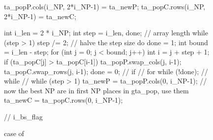 \documentclass[nojss,shortnames,article]{jss}
\begin{document}
\begin{sidewaysfigure}
\begin{minipage}{0.56\linewidth}
\begin{CodeChunk}
\begin{CodeInput}
{	    ta_popP.cols(i_NP, 2*i_NP-1) = ta_newP;
	    ta_popC.rows(i_NP, 2*i_NP-1) = ta_newC;

	    int i_len = 2 * i_NP;
	    int step = i_len, done;	// array length 
	    while (step > 1) {
		step /= 2;   		// halve the step size 
		do {
		    done = 1;
		    int bound  = i_len - step;
		    for (int j = 0; j < bound; j++) {
			int i = j + step + 1;
			if (ta_popC[j] > ta_popC[i-1]) {
			    ta_popP.swap_cols(j, i-1);
			    ta_popC.swap_rows(j, i-1);
			    done = 0;
			}  // if 
		    }  // for 
		} while (!done); // while
	    } // while (step > 1) 
	    ta_newP = ta_popP.cols(0, i_NP-1);	// now the best NP are in first NP places in gta_pop, use them
	    ta_newC = ta_popC.rows(0, i_NP-1);
	} // i_bs_flag
      \end{CodeInput}
    \end{CodeChunk}
    
    \normalsize {}
  \end{minipage}
  \caption{ case of }
  \label{fig:devol_bs_flag}
\end{sidewaysfigure}
\end{document}
